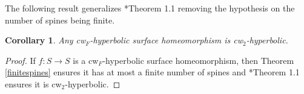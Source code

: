 \documentclass{amsart}
\theoremstyle{plain}
\newtheorem{thm}[theorem]{Theorem}
\newtheorem{corollary}[theorem]{Corollary}
\theoremstyle{definition}
\newcommand{\ep} {\epsilon}
\renewcommand{\epsilon}{\varepsilon}
\newcommand{\N}{\mathbb{N}}
\newcommand{\eps}{\varepsilon}
\newcommand{\dist}{\operatorname{\textit{d}}}
\begin{document}
The following result generalizes \cite{ACS}*{Theorem 1.1} removing the hypothesis on the number of spines being finite.

\begin{corollary}\label{cor:cw2}
Any cw$_F$-hyperbolic surface homeomorphism is cw$_2$-hyperbolic.
\end{corollary}

\begin{proof}
If $f\colon S\to S$ is a cw$_F$-hyperbolic surface homeomorphism, then Theorem \ref{finitespines} ensures it has at most a finite number of spines and \cite{ACS}*{Theorem 1.1} ensures it is cw$_2$-hyperbolic.
\end{proof}



    
    
\end{document}
